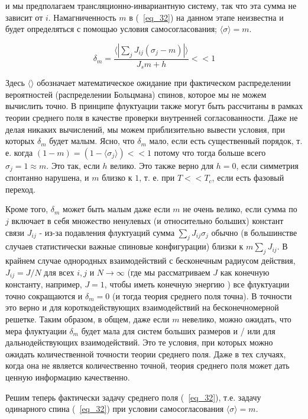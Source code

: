 \documentclass[11pt]{article}
\begin{document}
и мы предполагаем трансляционно-инвариантную систему, так что эта сумма не зависит от $i$. Намагниченность $m$ в (~\ref{eq_32}) на данном этапе неизвестна и будет определяться с помощью условия самосогласования; $\langle \sigma \rangle = m $.

\begin{equation}
\delta_m = \frac{\langle | \sum_jJ_{ij}(\sigma_j-m)| \rangle}{J_sm+h} << 1
\label{eq_34}
\end{equation}

Здесь $\langle \rangle$ обозначает математическое ожидание при фактическом распределении вероятностей (распределении Больцмана) спинов, которое мы не можем вычислить точно. В принципе флуктуации также могут быть рассчитаны в рамках теории среднего поля в качестве проверки внутренней согласованности. Даже не делая никаких вычислений, мы можем приблизительно вывести условия, при которых $\delta_m$ будет малым. Ясно, что $\delta_m$ мало, если есть существенный порядок, т. е. когда $(1 - m) = (1 - \langle \sigma_j\rangle) << 1$  потому что тогда больше всего $\sigma_j=1 \approx m$. Это так, если $h$ велико. Это также верно для $h = 0$, если симметрия спонтанно нарушена, и $m$ близко к $1$, т. е. при $T << T_c$, если есть фазовый переход.

Кроме того, $\delta_m$ может быть малым даже если $m$ не очень велико, если сумма по $j$ включает в себя множество ненулевых (и относительно больших) констант связи $J_{ij}$ - из-за подавления флуктуаций сумма $\sum_jJ_{ij}\sigma_j$ обычно (в большинстве случаев статистически важные спиновые конфигурации) близки к $m\sum_jJ_{ij}$. 
В крайнем случае однородных взаимодействий с бесконечным радиусом действия, $J_{ij} = J / N$ для всех $i, j$ и $N → ∞$ (где мы рассматриваем $J$ как конечную константу, например, $J = 1$, чтобы иметь конечную энергию ) все флуктуации точно сокращаются и $\delta_m = 0$ (и тогда теория среднего поля точна). 
В точности это верно и для короткодействующих взаимодействий на бесконечномерной решетке. Таким образом, в общем, даже если $m$ невелико, можно ожидать, что мера флуктуации $\delta_m$ будет мала для систем больших размеров и / или для дальнодействующих взаимодействий. Это те условия, при которых можно ожидать количественной точности теории среднего поля. Даже в тех случаях, когда она не является количественно точной, теория среднего поля может дать ценную информацию качественно.

Решим теперь фактически задачу среднего поля (~\ref{eq_32}), т.е. задачу одинарного спина (~\ref{eq_32}) при условии самосогласования $\langle \sigma \rangle = m$. 
\end{document}
